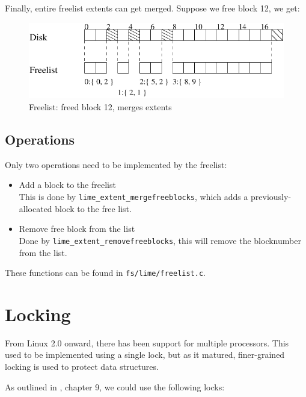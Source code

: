 Finally, entire freelist extents can get merged. Suppose we free block 12, we get:

\begin{figure}[h]
\includegraphics[width=12cm]{freelist4}
\caption{Freelist: freed block 12, merges extents}
\end{figure}

\subsection{Operations}

Only two operations need to be implemented by the freelist:

\begin{itemize}
\item Add a block to the freelist \\
This is done by \texttt{lime\_extent\_mergefreeblocks}, which adds a previously-allocated block to the free list.
\item Remove free block from the list \\
Done by \texttt{lime\_extent\_removefreeblocks}, this will remove the blocknumber from the list.
\end{itemize}

These functions can be found in \texttt{fs/lime/freelist.c}.

\section{Locking}

From Linux 2.0 onward, there has been support for multiple processors. This used to be implemented using a single lock, but as it matured, finer-grained locking is used to protect data structures.


As outlined in \cite{LKD}, chapter 9, we could use the following locks:

